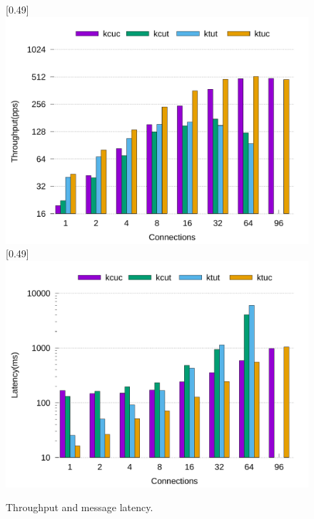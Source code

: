 \documentclass[sigconf,review,anonymous]{acmart}
\providecommand{\DIFaddbegin}{} %
\providecommand{\DIFaddend}{} %
\providecommand{\DIFdelbegin}{} %
\providecommand{\DIFdelend}{} %
\providecommand{\DIFaddbeginFL}{} %
\providecommand{\DIFaddendFL}{} %
\providecommand{\DIFdelbeginFL}{} %
\providecommand{\DIFdelendFL}{} %
\begin{document}
\DIFdelbegin %
\DIFdelendFL \DIFaddbeginFL \begin{figure}[ht]
	\DIFaddendFL \centering
	[0.49\linewidth]
	{
		\includegraphics[width=\linewidth]{assets/throughput.pdf}
	}
	[0.49\linewidth]
	{
		\includegraphics[width=\linewidth]{assets/latency.pdf}
	}
	\caption{Throughput and message latency.}
	\label{fig:throughput-latency}
\DIFdelbeginFL %
\DIFdelend \DIFaddbegin \end{figure}
\DIFaddend 
\end{document}
